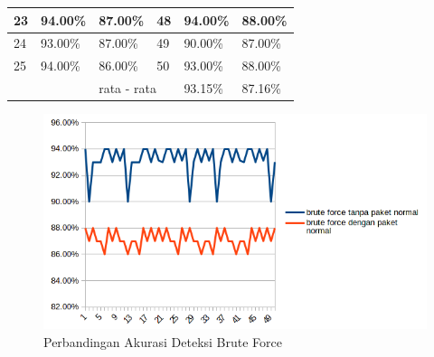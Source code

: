 \begin{table}[H]
\begin{tabular}{|l|l|l|l|l|l|}
		23 & 94.00\%                                                                                       & 87.00\%                                                                                         & 48 & 94.00\%                                                                                       & 88.00\%                                                                                         \\ \hline
		24 & 93.00\%                                                                                       & 87.00\%                                                                                         & 49 & 90.00\%                                                                                       & 87.00\%                                                                                         \\ \hline
		25 & 94.00\%                                                                                       & 86.00\%                                                                                         & 50 & 93.00\%                                                                                       & 88.00\%                                                                                         \\ \hline
		&                                                                                               & \multicolumn{2}{l|}{rata - rata}                                                                     & 93.15\%                                                                                       & 87.16\%                                                                                         \\ \hline
	\end{tabular}
\end{table}



\begin{figure}[H]
	\centering
	\includegraphics[scale=0.9]{gambar/pbrute}
	\caption{Perbandingan Akurasi Deteksi Brute Force}
	\label{Perbandingan Akurasi Deteksi Brute Force}
\end{figure}

